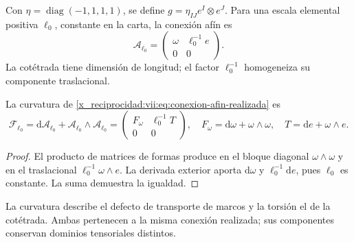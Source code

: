 Con \(\eta=\operatorname{diag}(-1,1,1,1)\), se define
\(g=\eta_{IJ}e^I\otimes e^J\). Para una escala elemental
positiva \(\ell_0\), constante en la carta, la conexión afín es
\begin{equation}
 \mathcal A_{\ell_0}
 =\begin{pmatrix}\omega&\ell_0^{-1}e\\0&0\end{pmatrix}.
 \label{x_reciprocidad:vii:eq:conexion-afin-realizada}
\end{equation}
La cotétrada tiene dimensión de longitud; el factor
\(\ell_0^{-1}\) homogeneiza su componente traslacional.

\begin{proposition}
\label{x_reciprocidad:vii:prop:curvatura-afin}
La curvatura de \eqref{x_reciprocidad:vii:eq:conexion-afin-realizada} es
\begin{equation}
 \mathcal F_{\ell_0}
 =\mathrm d\mathcal A_{\ell_0}
   +\mathcal A_{\ell_0}\wedge\mathcal A_{\ell_0}
 =\begin{pmatrix}F_\omega&\ell_0^{-1}T\\0&0\end{pmatrix},
 \quad F_\omega=\mathrm d\omega+\omega\wedge\omega,
 \quad T=\mathrm de+\omega\wedge e.
 \label{x_reciprocidad:vii:eq:curvatura-afin-realizada}
\end{equation}
\end{proposition}
\begin{proof}
El producto de matrices de formas produce en el bloque diagonal
\(\omega\wedge\omega\) y en el traslacional
\(\ell_0^{-1}\omega\wedge e\). La derivada exterior aporta
\(\mathrm d\omega\) y \(\ell_0^{-1}\mathrm de\), pues
\(\ell_0\) es constante. La suma demuestra la igualdad.
\end{proof}

La curvatura describe el defecto de transporte de marcos y la torsión
el de la cotétrada. Ambas pertenecen a la misma conexión realizada;
sus componentes conservan dominios tensoriales distintos.

